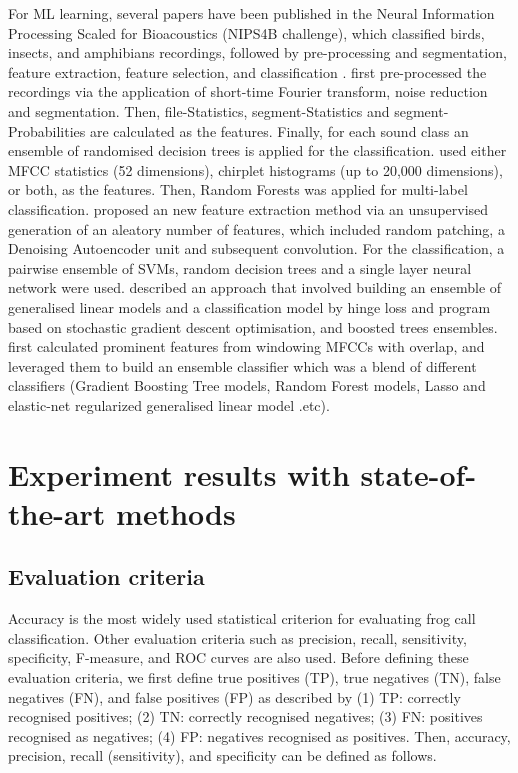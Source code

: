 For ML learning, several papers have been published in the Neural Information Processing Scaled for Bioacoustics (NIPS4B challenge), which classified birds, insects, and amphibians recordings, followed by pre-processing and segmentation, feature extraction, feature selection, and classification \citep{lasseck2013bird, stowell2013feature, mencia2013learning, massaronensemble, chen2013novel}. \citep{lasseck2013bird} first pre-processed the recordings via the application of short-time Fourier transform, noise reduction and segmentation. Then, file-Statistics, segment-Statistics and segment-Probabilities are calculated as the features. Finally, for each sound class an ensemble of
randomised decision trees is applied for the classification. \citep{stowell2013feature} used either MFCC statistics (52 dimensions), chirplet histograms (up
to 20,000 dimensions), or both, as the features. Then, Random Forests was applied for multi-label classification. \citep{mencia2013learning} proposed an new feature extraction method via an unsupervised generation of an aleatory number of features, which included random patching, a Denoising Autoencoder unit and subsequent convolution. For the classification, a pairwise ensemble of SVMs, random decision trees and a single layer
neural network were used. 
\citep{massaronensemble} described an approach that involved building an ensemble of generalised linear models and a classification model by hinge loss and program based on stochastic gradient descent optimisation, and boosted trees ensembles. 
\citep{chen2013novel} first calculated prominent features from windowing MFCCs with overlap, and leveraged them to build an ensemble classifier which was a blend of different classifiers (Gradient Boosting Tree models, Random Forest models, Lasso and elastic-net regularized generalised linear model .etc).




\section{Experiment results with state-of-the-art methods}
\label{experiment}


\subsection{Evaluation criteria}

Accuracy is the most widely used statistical criterion for evaluating frog call classification. Other evaluation criteria such as precision, recall, sensitivity, specificity, F-measure, and ROC curves are also used. Before defining these evaluation criteria, we first define true positives (TP), true negatives (TN), false negatives (FN), and false positives (FP) as described by  \citep{gordon2003sequence} 
(1) TP: correctly recognised positives;
(2) TN: correctly recognised negatives;
(3) FN: positives recognised as negatives;
(4) FP: negatives recognised as positives.
Then, accuracy, precision, recall (sensitivity), and specificity can be defined as follows.

